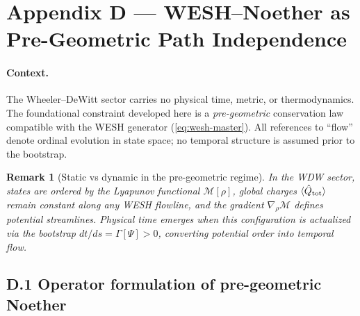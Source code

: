 \documentclass[12pt,a4paper]{article}
\newtheorem{remark}{Remark}[section]
\numberwithin{equation}{section}
\begin{document}
\vspace{1cm}

\section*{Appendix D — WESH--Noether as Pre-Geometric Path Independence}
\label{app:wesh-noether-pregeom}

\begingroup
\setcounter{equation}{0}
\renewcommand\theequation{D.\arabic{equation}}
\renewcommand{\theHequation}{D.\arabic{equation}}
\setcounter{theorem}{0}
\renewcommand\thetheorem{D.\arabic{theorem}}
\renewcommand{\theHtheorem}{D.\arabic{theorem}}
\setcounter{corollary}{0}
\renewcommand\thecorollary{D.\arabic{corollary}}
\renewcommand{\theHcorollary}{D.\arabic{corollary}}
\setcounter{remark}{0}
\renewcommand\theremark{D.\arabic{remark}}
\renewcommand{\theHremark}{D.\arabic{remark}}
\setcounter{lemma}{0}
\renewcommand\thelemma{D.\arabic{lemma}}
\renewcommand{\theHlemma}{D.\arabic{lemma}}

\paragraph{Context.}
The Wheeler--DeWitt sector carries no physical time, metric, or thermodynamics. The foundational constraint developed here is a \emph{pre-geometric} conservation law compatible with the WESH generator (\eqref{eq:wesh-master}). All references to ``flow'' denote ordinal evolution in state space; no temporal structure is assumed prior to the bootstrap.

\begin{remark}[Static vs dynamic in the pre-geometric regime]
\label{rem:static-dynamic}
In the WDW sector, states are ordered by the Lyapunov functional $\mathcal{M}[\rho]$, global charges $\langle\hat{Q}_{\rm tot}\rangle$ remain constant along any WESH flowline, and the gradient $\nabla_\rho\mathcal{M}$ defines potential streamlines. Physical time emerges when this configuration is \emph{actualized} via the bootstrap $dt/ds=\Gamma[\Psi]>0$, converting potential order into temporal flow.
\end{remark}


\vspace{0.3cm}
\subsection*{D.1 Operator formulation of pre-geometric Noether}
\vspace{0.3cm}
\end{document}
